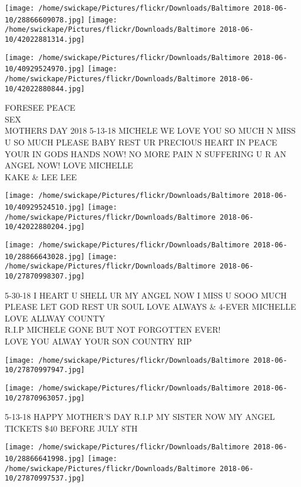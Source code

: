 \documentclass[10pt,letterpaper]{article}
\begin{document}
\texttt{[image: /home/swickape/Pictures/flickr/Downloads/Baltimore 2018-06-10/28866609078.jpg]}
\texttt{[image: /home/swickape/Pictures/flickr/Downloads/Baltimore 2018-06-10/42022881314.jpg]}

\texttt{[image: /home/swickape/Pictures/flickr/Downloads/Baltimore 2018-06-10/40929524970.jpg]}
\texttt{[image: /home/swickape/Pictures/flickr/Downloads/Baltimore 2018-06-10/42022880844.jpg]}

FORESEE PEACE\\
SEX\\
MOTHERS DAY 2018 5{-}13{-}18 MICHELE WE LOVE YOU SO MUCH N MISS U SO MUCH PLEASE BABY REST UR PRECIOUS HEART IN PEACE YOUR IN GODS HANDS NOW!  NO MORE PAIN N SUFFERING U R AN ANGEL NOW!  LOVE MICHELLE\\
KAKE \& LEE LEE
\pagebreak

\texttt{[image: /home/swickape/Pictures/flickr/Downloads/Baltimore 2018-06-10/40929524510.jpg]}
\texttt{[image: /home/swickape/Pictures/flickr/Downloads/Baltimore 2018-06-10/42022880204.jpg]}

\texttt{[image: /home/swickape/Pictures/flickr/Downloads/Baltimore 2018-06-10/28866643028.jpg]}
\texttt{[image: /home/swickape/Pictures/flickr/Downloads/Baltimore 2018-06-10/27870998307.jpg]}

5{-}30{-}18 I HEART U SHELL UR MY ANGEL NOW I MISS U SOOO MUCH PLEASE LET GOD REST UR SOUL LOVE ALWAYS \& 4{-}EVER MICHELLE\\
LOVE ALLWAY COUNTY\\
R.I.P MICHELE GONE BUT NOT FORGOTTEN EVER!\\
LOVE YOU ALWAY YOUR SON COUNTRY RIP
\pagebreak

\texttt{[image: /home/swickape/Pictures/flickr/Downloads/Baltimore 2018-06-10/27870997947.jpg]}

\vspace{0.25in}
\texttt{[image: /home/swickape/Pictures/flickr/Downloads/Baltimore 2018-06-10/27870963057.jpg]}

5{-}13{-}18 HAPPY MOTHER'S DAY R.I.P MY SISTER NOW MY ANGEL\\
TICKETS \$40 BEFORE JULY 8TH
\pagebreak

\texttt{[image: /home/swickape/Pictures/flickr/Downloads/Baltimore 2018-06-10/28866641998.jpg]}
\texttt{[image: /home/swickape/Pictures/flickr/Downloads/Baltimore 2018-06-10/27870997537.jpg]}
\end{document}
